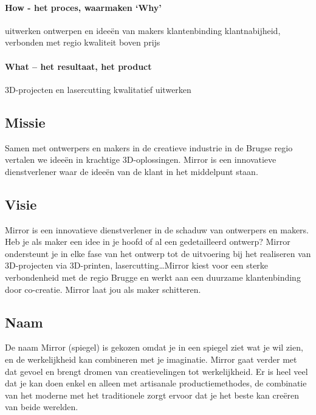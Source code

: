 \paragraph{\textbf{How} - het proces, waarmaken `\textbf{Why}'}

uitwerken ontwerpen en ideeën van makers
klantenbinding
klantnabijheid, verbonden met regio
kwaliteit boven prijs

\paragraph{\textbf{What} – het resultaat, het product}

3D-projecten en lasercutting kwalitatief uitwerken
\subsection{Missie} %
\label{sub:missie}
Samen met ontwerpers en makers in de creatieve industrie in de Brugse regio vertalen we ideeën in krachtige 3D-oplossingen.  Mirror is een innovatieve dienstverlener waar de ideeën van de klant in het middelpunt staan.
\subsection{Visie} %
\label{sub:visie}
Mirror is een innovatieve dienstverlener in de schaduw van ontwerpers en makers. Heb je als maker een idee in je hoofd of al een gedetailleerd ontwerp? Mirror ondersteunt je in elke fase van het ontwerp tot de uitvoering bij het realiseren van 3D-projecten via 3D-printen, lasercutting\dots Mirror kiest voor een sterke verbondenheid met de regio Brugge en werkt aan een duurzame klantenbinding door co-creatie. Mirror laat jou als maker schitteren.
\subsection{Naam} %
\label{sub:naam}

De naam Mirror (spiegel) is gekozen omdat je in een spiegel ziet wat je wil zien, en de werkelijkheid kan combineren met je imaginatie. Mirror gaat verder met dat gevoel en brengt dromen van creatievelingen tot werkelijkheid. Er is heel veel dat je kan doen enkel en alleen met artisanale productiemethodes, de combinatie van het moderne met het traditionele zorgt ervoor dat je het beste kan creëren van beide werelden.

